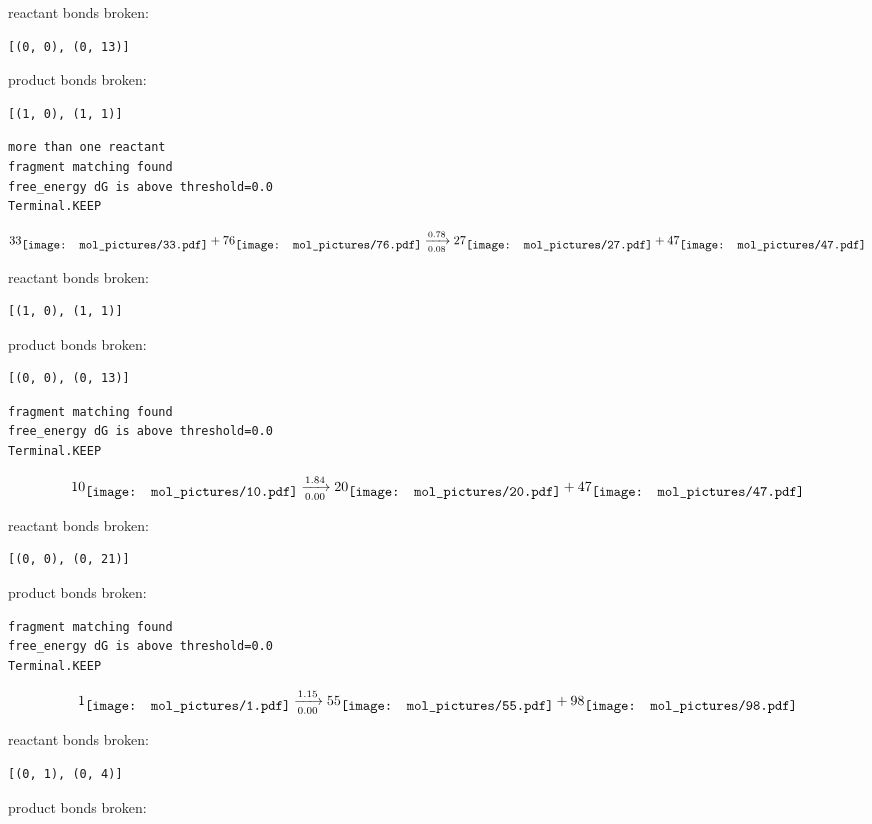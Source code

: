 \documentclass{article}
\begin{document}
reactant bonds broken:\begin{verbatim}
[(0, 0), (0, 13)]
\end{verbatim}
product bonds broken:\begin{verbatim}
[(1, 0), (1, 1)]
\end{verbatim}




\vspace{1cm}
\begin{verbatim}
more than one reactant
fragment matching found
free_energy dG is above threshold=0.0
Terminal.KEEP
\end{verbatim}
$$
33
\raisebox{-.5\height}{\texttt{[image: mol\_pictures/33.pdf]}}
+
76
\raisebox{-.5\height}{\texttt{[image: mol\_pictures/76.pdf]}}
\xrightarrow[0.08]{0.78}
27
\raisebox{-.5\height}{\texttt{[image: mol\_pictures/27.pdf]}}
+
47
\raisebox{-.5\height}{\texttt{[image: mol\_pictures/47.pdf]}}
$$


reactant bonds broken:\begin{verbatim}
[(1, 0), (1, 1)]
\end{verbatim}
product bonds broken:\begin{verbatim}
[(0, 0), (0, 13)]
\end{verbatim}




\vspace{1cm}
\begin{verbatim}
fragment matching found
free_energy dG is above threshold=0.0
Terminal.KEEP
\end{verbatim}
$$
10
\raisebox{-.5\height}{\texttt{[image: mol\_pictures/10.pdf]}}
\xrightarrow[0.00]{1.84}
20
\raisebox{-.5\height}{\texttt{[image: mol\_pictures/20.pdf]}}
+
47
\raisebox{-.5\height}{\texttt{[image: mol\_pictures/47.pdf]}}
$$


reactant bonds broken:\begin{verbatim}
[(0, 0), (0, 21)]
\end{verbatim}
product bonds broken:



\vspace{1cm}
\begin{verbatim}
fragment matching found
free_energy dG is above threshold=0.0
Terminal.KEEP
\end{verbatim}
$$
1
\raisebox{-.5\height}{\texttt{[image: mol\_pictures/1.pdf]}}
\xrightarrow[0.00]{1.15}
55
\raisebox{-.5\height}{\texttt{[image: mol\_pictures/55.pdf]}}
+
98
\raisebox{-.5\height}{\texttt{[image: mol\_pictures/98.pdf]}}
$$


reactant bonds broken:\begin{verbatim}
[(0, 1), (0, 4)]
\end{verbatim}
product bonds broken:



\vspace{1cm}
\end{document}
